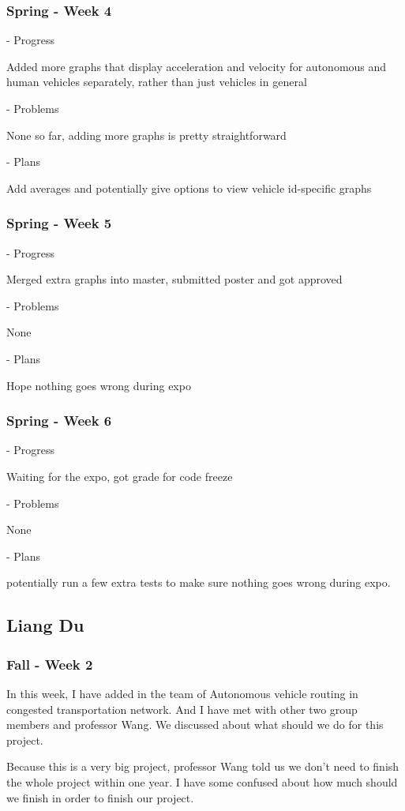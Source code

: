 \documentclass[onecolumn, draftclsnofoot,10pt, compsoc]{IEEEtran}
\begin{document}
\subsubsection{Spring - Week 4}
- Progress

Added more graphs that display acceleration and velocity for autonomous and human vehicles separately, rather than just vehicles in general

- Problems

None so far, adding more graphs is pretty straightforward

- Plans

Add averages and potentially give options to view vehicle id-specific graphs
\subsubsection{Spring - Week 5}
- Progress

Merged extra graphs into master, submitted poster and got approved

- Problems

None

- Plans

Hope nothing goes wrong during expo
\subsubsection{Spring - Week 6}
- Progress

Waiting for the expo, got grade for code freeze

- Problems

None

- Plans

potentially run a few extra tests to make sure nothing goes wrong during expo.
\subsection{Liang Du}
\subsubsection{Fall - Week 2}
In this week, I have added in the team of Autonomous vehicle routing in congested transportation network.
And I have met with other two group members and professor Wang.
We discussed about what should we do for this project.

Because this is a very big project, professor Wang told us we don't need to finish the whole project within one year.
I have some confused about how much should we finish in order to finish our project.
\end{document}

